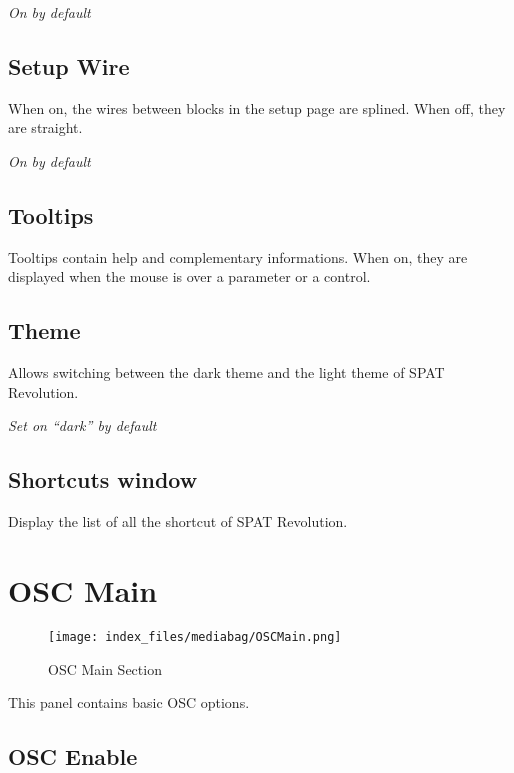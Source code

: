 \documentclass[
  letterpaper,
  DIV=11,
  numbers=noendperiod]{scrreport}
\begin{document}
\emph{On by default}

\hypertarget{setup-wire}{%
\subsection{Setup Wire}\label{setup-wire}}

When on, the wires between blocks in the setup page are splined. When
off, they are straight.

\emph{On by default}

\hypertarget{tooltips}{%
\subsection{Tooltips}\label{tooltips}}

Tooltips contain help and complementary informations. When on, they are
displayed when the mouse is over a parameter or a control.

\hypertarget{theme}{%
\subsection{Theme}\label{theme}}

Allows switching between the dark theme and the light theme of SPAT
Revolution.

\emph{Set on ``dark'' by default}

\hypertarget{shortcuts-window}{%
\subsection{Shortcuts window}\label{shortcuts-window}}

Display the list of all the shortcut of SPAT Revolution.

\hypertarget{osc-main}{%
\section{OSC Main}\label{osc-main}}

\begin{figure}

{\centering \texttt{[image: index\_files/mediabag/OSCMain.png]}

}

\caption{OSC Main Section}

\end{figure}

This panel contains basic OSC options.

\hypertarget{osc-enable}{%
\subsection{OSC Enable}\label{osc-enable}}
\end{document}
